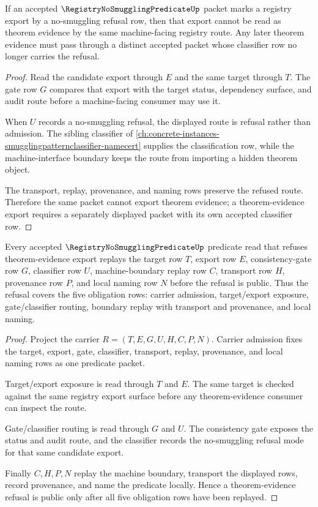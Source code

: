 \begin{theorem}
\label{thm:registry-no-smuggling-predicate-refusal-blocks-export}
If an accepted $\RegistryNoSmugglingPredicateUp$ packet marks a registry export by a no-smuggling refusal row, then that export cannot be read as theorem evidence by the same machine-facing registry route. Any later theorem evidence must pass through a distinct accepted packet whose classifier row no longer carries the refusal.
\end{theorem}
\begin{proof}
Read the candidate export through $E$ and the same target through $T$. The gate row $G$ compares that export with the target status, dependency surface, and audit route before a machine-facing consumer may use it.

When $U$ records a no-smuggling refusal, the displayed route is refusal rather than admission. The sibling classifier of \autoref{ch:concrete-instances-smugglingpatternclassifier-namecert} supplies the classification row, while the machine-interface boundary keeps the route from importing a hidden theorem object.

The transport, replay, provenance, and naming rows preserve the refused route. Therefore the same packet cannot export theorem evidence; a theorem-evidence export requires a separately displayed packet with its own accepted classifier row.
\end{proof}

\begin{theorem}
\label{thm:registry-no-smuggling-predicate-boundary-replay}
Every accepted $\RegistryNoSmugglingPredicateUp$ predicate read that refuses theorem-evidence export replays the target row $T$, export row $E$, consistency-gate row $G$, classifier row $U$, machine-boundary replay row $C$, transport row $H$, provenance row $P$, and local naming row $N$ before the refusal is public. Thus the refusal covers the five obligation rows: carrier admission, target/export exposure, gate/classifier routing, boundary replay with transport and provenance, and local naming.
\end{theorem}
\begin{proof}
Project the carrier $R=(T,E,G,U,H,C,P,N)$. Carrier admission fixes the target, export, gate, classifier, transport, replay, provenance, and local naming rows as one predicate packet.

Target/export exposure is read through $T$ and $E$. The same target is checked against the same registry export surface before any theorem-evidence consumer can inspect the route.

Gate/classifier routing is read through $G$ and $U$. The consistency gate exposes the status and audit route, and the classifier records the no-smuggling refusal mode for that same candidate export.

Finally $C,H,P,N$ replay the machine boundary, transport the displayed rows, record provenance, and name the predicate locally. Hence a theorem-evidence refusal is public only after all five obligation rows have been replayed.
\end{proof}

